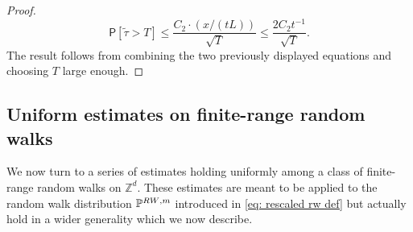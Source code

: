 \documentclass[11pt,a4paper]{article}
\numberwithin{equation}{section}
\theoremstyle{plain}
\theoremstyle{definition}
\begin{document}
\begin{proof}
  \begin{equation}
  	\mathsf P[\tilde \tau >T]\leq \frac{C_2\cdot (x/(tL))}{\sqrt{T}}\leq \frac{2C_2t^{-1}}{\sqrt{T}}.
  \end{equation}
The result follows from combining the two previously displayed equations and choosing $T$ large enough.
\end{proof}


\subsection{Uniform estimates on finite-range random walks}\label{appendix:uniform rw estimates}

We now turn to a series of estimates holding uniformly among a class of finite-range random walks on $\mathbb Z^d$. These estimates are meant to be applied to the random walk distribution $\mathbb P^{{\rm RW},m}$ introduced in \eqref{eq: rescaled rw def} but actually hold in a wider generality which we now describe.
\end{document}
